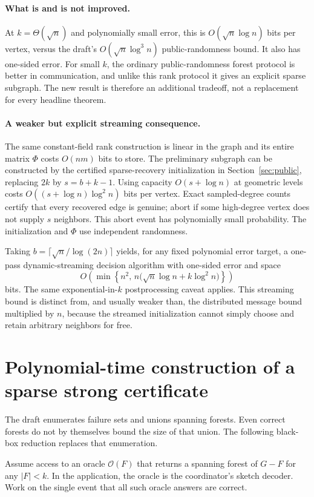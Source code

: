 \documentclass[11pt]{article}
\theoremstyle{remark}\newtheorem{remark}[theorem]{Remark}
\begin{document}
\paragraph{What is and is not improved.}
At $k=\Theta(\sqrt n)$ and polynomially small error, this is $O(\sqrt n\log n)$ bits per vertex, versus the draft's $O(\sqrt n\log^3n)$ public-randomness bound. It also has one-sided error. For small $k$, the ordinary public-randomness forest protocol is better in communication, and unlike this rank protocol it gives an explicit sparse subgraph. The new result is therefore an additional tradeoff, not a replacement for every headline theorem.

\paragraph{A weaker but explicit streaming consequence.}
The same constant-field rank construction is linear in the graph and its entire matrix $\Phi$ costs $O(nm)$ bits to store. The preliminary subgraph can be constructed by the certified sparse-recovery initialization in Section~\ref{sec:public}, replacing $2k$ by $s=b+k-1$. Using capacity $O(s+\log n)$ at geometric levels costs $O((s+\log n)\log^2n)$ bits per vertex. Exact sampled-degree counts certify that every recovered edge is genuine; abort if some high-degree vertex does not supply $s$ neighbors. This abort event has polynomially small probability. The initialization and $\Phi$ use independent randomness.

Taking $b=\lceil\sqrt n/\log(2n)\rceil$ yields, for any fixed polynomial error target, a one-pass dynamic-streaming decision algorithm with one-sided error and space
\[
 O\!\left(\min\left\{n^2,\,
 n\bigl(\sqrt n\log n+k\log^2n\bigr)\right\}\right)
\]
bits. The same exponential-in-$k$ postprocessing caveat applies. This streaming bound is distinct from, and usually weaker than, the distributed message bound multiplied by $n$, because the streamed initialization cannot simply choose and retain arbitrary neighbors for free.

\section{Polynomial-time construction of a sparse strong certificate}
The draft enumerates failure sets and unions spanning forests. Even correct forests do not by themselves bound the size of that union. The following black-box reduction replaces that enumeration.

Assume access to an oracle $\mathcal O(F)$ that returns a spanning forest of $G-F$ for any $|F|<k$. In the application, the oracle is the coordinator's sketch decoder. Work on the single event that all such oracle answers are correct.
\end{document}
